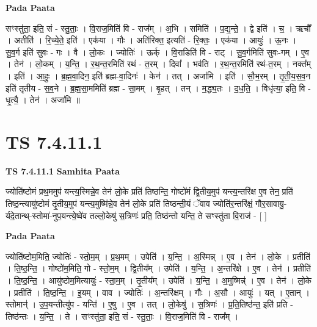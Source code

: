 \documentclass[17pt]{extarticle}
\begin{document}
\textbf{Pada Paata} \newline

सꣳस्तु॑ता॒ इति॒ सं - स्तु॒ताः॒ । वि॒राज॒मिति॑ वि - राज᳚म् । अ॒भि । समिति॑ । प॒द्य॒न्ते॒ । द्वे इति॑ । च॒ । ऋचौ᳚ । अतीति॑ । रि॒च्ये॒ते॒ इति॑ । एक॑या । गौः । अति॑रिक्त॒ इत्यति॑ - रि॒क्तः॒ । एक॑या । आयुः॑ । ऊ॒नः । सु॒व॒र्ग इति॑ सुवः - गः । वै । लो॒कः । ज्योतिः॑ । ऊर्क् । वि॒राडिति॑ वि - राट् । सु॒व॒र्गमिति॑ सुवः-गम् । ए॒व । तेन॑ । लो॒कम् । य॒न्ति॒ । र॒थ॒न्त॒रमिति॑ रथं - त॒रम् । दिवा᳚ । भव॑ति । र॒थ॒न्त॒रमिति॑ रथं-त॒रम् । नक्त᳚म् । इति॑ । आ॒हुः॒ । ब्र॒ह्म॒वा॒दिन॒ इति॑ ब्रह्म-वा॒दिनः॑ । केन॑ । तत् । अजा॑मि । इति॑ । सौ॒भ॒रम् । तृ॒ती॒य॒स॒व॒न इति॑ तृतीय - स॒व॒ने । ब्र॒ह्म॒सा॒ममिति॑ ब्रह्म - सा॒मम् । बृ॒हत् । तन् । म॒द्ध्य॒तः । द॒ध॒ति॒ । विधृ॑त्या॒ इति॒ वि - धृ॒त्यै॒ । तेन॑ । अजा॑मि ॥  \newline




\section*{ TS 7.4.11.1 }

\textbf{TS 7.4.11.1 } \newline
\textbf{Samhita Paata} \newline

ज्योति॑ष्टोमं प्रथ॒ममुप॑ यन्त्य॒स्मिन्ने॒व तेन॑ लो॒के प्रति॑ तिष्ठन्ति॒ गोष्टो॑मं द्वि॒तीय॒मुप॑ यन्त्य॒न्तरि॑क्ष ए॒व तेन॒ प्रति॑ तिष्ठ॒न्त्यायु॑ष्टोमं तृ॒तीय॒मुप॑ यन्त्य॒मुष्मि॑न्ने॒व तेन॑ लो॒के प्रति॑ तिष्ठन्ती॒यं ॅवाव ज्योति॑र॒न्तरि॑क्षं॒ गौर॒सावायु॒-र्यदे॒तान्थ्-स्तोमा॑-नुप॒यन्त्ये॒ष्वे॑व तल्लो॒केषु॑ स॒त्रिणः॑ प्रति॒ तिष्ठ॑न्तो यन्ति॒ ते सꣳस्तु॑ता वि॒राज॑ - [  ] \newline

\textbf{Pada Paata} \newline

ज्योति॑ष्टोम॒मिति॒ ज्योतिः॑ - स्तो॒म॒म् । प्र॒थ॒मम् । उपेति॑ । य॒न्ति॒ । अ॒स्मिन्न् । ए॒व । तेन॑ । लो॒के । प्रतीति॑ । ति॒ष्ठ॒न्ति॒ । गोष्टो॑म॒मिति॒ गो - स्तो॒म॒म् । द्वि॒तीय᳚म् । उपेति॑ । य॒न्ति॒ । अ॒न्तरि॑क्षे । ए॒व । तेन॑ । प्रतीति॑ । ति॒ष्ठ॒न्ति॒ । आयु॑ष्टोम॒मित्यायुः॑ - स्ता॒म॒म् । तृ॒तीय᳚म् । उपेति॑ । य॒न्ति॒ । अ॒मुष्मिन्न्॑ । ए॒व । तेन॑ । लो॒के । प्रतीति॑ । ति॒ष्ठ॒न्ति॒ । इ॒यम् । वाव । ज्योतिः॑ । अ॒न्तरि॑क्षम् । गौः । अ॒सौ । आयुः॑ । यत् । ए॒तान् । स्तोमान्॑ । उ॒प॒यन्तीत्यु॑प - यन्ति॑ । ए॒षु । ए॒व । तत् । लो॒केषु॑ । स॒त्रिणः॑ । प्र॒ति॒तिष्ठ॑न्त॒ इति॑ प्रति - तिष्ठ॑न्तः । य॒न्ति॒ । ते । सꣳस्तु॑ता॒ इति॒ सं - स्तु॒ताः॒ । वि॒राज॒मिति॑ वि - राज᳚म् ।  \newline
\end{document}
